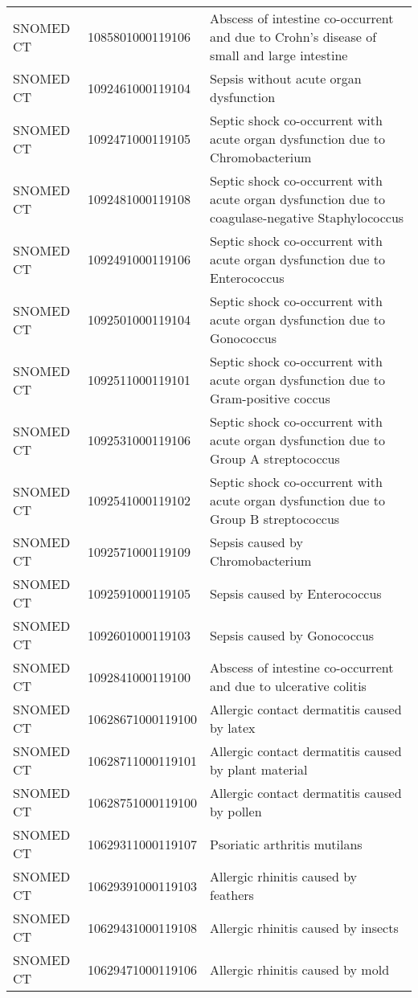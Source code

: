 \begin{longtable}{p{}p{}p{}}
  SNOMED CT & 1085801000119106 & Abscess of intestine co-occurrent and due to Crohn's disease of small and large intestine \\ 
  SNOMED CT & 1092461000119104 & Sepsis without acute organ dysfunction \\ 
  SNOMED CT & 1092471000119105 & Septic shock co-occurrent with acute organ dysfunction due to Chromobacterium \\ 
  SNOMED CT & 1092481000119108 & Septic shock co-occurrent with acute organ dysfunction due to coagulase-negative Staphylococcus \\ 
  SNOMED CT & 1092491000119106 & Septic shock co-occurrent with acute organ dysfunction due to Enterococcus \\ 
  SNOMED CT & 1092501000119104 & Septic shock co-occurrent with acute organ dysfunction due to Gonococcus \\ 
  SNOMED CT & 1092511000119101 & Septic shock co-occurrent with acute organ dysfunction due to Gram-positive coccus \\ 
  SNOMED CT & 1092531000119106 & Septic shock co-occurrent with acute organ dysfunction due to Group A streptococcus \\ 
  SNOMED CT & 1092541000119102 & Septic shock co-occurrent with acute organ dysfunction due to Group B streptococcus \\ 
  SNOMED CT & 1092571000119109 & Sepsis caused by Chromobacterium \\ 
  SNOMED CT & 1092591000119105 & Sepsis caused by Enterococcus \\ 
  SNOMED CT & 1092601000119103 & Sepsis caused by Gonococcus \\ 
  SNOMED CT & 1092841000119100 & Abscess of intestine co-occurrent and due to ulcerative colitis \\ 
  SNOMED CT & 10628671000119100 & Allergic contact dermatitis caused by latex \\ 
  SNOMED CT & 10628711000119101 & Allergic contact dermatitis caused by plant material \\ 
  SNOMED CT & 10628751000119100 & Allergic contact dermatitis caused by pollen \\ 
  SNOMED CT & 10629311000119107 & Psoriatic arthritis mutilans \\ 
  SNOMED CT & 10629391000119103 & Allergic rhinitis caused by feathers \\ 
  SNOMED CT & 10629431000119108 & Allergic rhinitis caused by insects \\ 
  SNOMED CT & 10629471000119106 & Allergic rhinitis caused by mold \\ 

\end{longtable}
